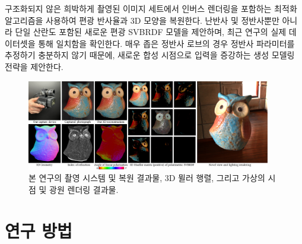 \documentclass[a4paper,twocolumn]{article}
\begin{document}
구조화되지 않은 희박하게 촬영된 이미지 세트에서 인버스 렌더링을 포함하는 최적화 알고리즘을 사용하여 편광 반사율과 3D 모양을 복원한다. 
난반사 및 정반사뿐만 아니라 단일 산란도 포함된 새로운 편광 SVBRDF 모델을 제안하며, 최근 연구의 실제 데이터셋을 통해 일치함을 확인한다.
매우 좁은 정반사 로브의 경우 정반사 파라미터를 추정하기 충분하지 않기 때문에, 새로운 합성 시점으로 입력을 증강하는 생성 모델링 전략을 제안한다.


\begin{figure}[tpb]
	\vspace{-2mm}%
	\centering%
	\footnotesize%
	\includegraphics[width=0.95\textwidth]{fig/teaser.pdf}%
	\vspace{-3mm}%
	\caption{본 연구의 촬영 시스템 및 복원 결과물, 3D 뮐러 행렬, 그리고 가상의 시점 및 광원 렌더링 결과물.}
	\label{fig:teaser}
	\vspace{-2mm}
\end{figure}

\section{연구 방법}
\label{sec:methods}
\end{document}
